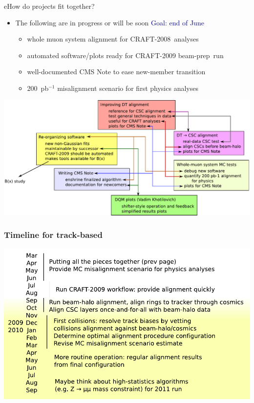 \documentclass[compress]{beamer}
\begin{document}
\begin{frame}
e{How do projects fit together?}

\begin{itemize}
\item The following are in progress or will be soon \hfill \textcolor{darkblue}{Goal: end of June}
\begin{itemize}
\item whole muon system alignment for \mbox{CRAFT-2008 analyses\hspace{-1 cm}}
\item automated software/plots ready for CRAFT-2009 \mbox{beam-prep run\hspace{-1 cm}}
\item well-documented CMS Note to ease new-member transition
\item 200~pb$^{-1}$ misalignment scenario for first physics analyses
\end{itemize}
\end{itemize}

\mbox{\hspace{-0.75 cm}\includegraphics[width=1.1\linewidth]{connections.pdf}}

\end{frame}

\begin{frame}
\frametitle{Timeline for track-based}
\vfill
\includegraphics[width=\linewidth]{timeline.pdf}

\vfill
\end{frame}
\end{document}
